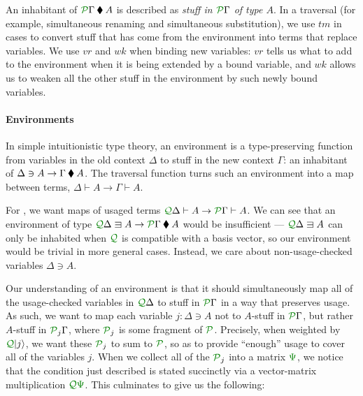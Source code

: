 \documentclass[submission,copyright,creativecommons]{eptcs}
\begin{document}
An inhabitant of $\ctx{\Gamma}{P} \kitrel A$ is described as
\emph{stuff in $\ctx{\Gamma}{P}$ of type $A$}.
In a traversal (for example, simultaneous renaming and simultaneous
substitution), we use $\mathit{tm}$ in  cases to convert stuff
that has come from the environment into terms that replace variables.
We use $\mathit{vr}$ and $\mathit{wk}$ when binding new variables: $\mathit{vr}$
tells us what to add to the environment when it is being extended by a bound
variable, and $\mathit{wk}$ allows us to weaken all the other stuff in the
environment by such newly bound variables.

\paragraph{Environments}
In simple intuitionistic type theory, an
environment is a type-preserving function from variables in the old
context $\Delta$ to stuff in the new context $\Gamma$: an inhabitant
of $\Delta \ni A \to \Gamma \mathbin{\blacklozenge} A$.  The traversal function turns
such an environment into a map between terms,
$\Delta \vdash A \to \Gamma \vdash A$.

For \name{}, we want maps of usaged terms
$\ctx{\Delta}{Q} \vdash A \to \ctx{\Gamma}{P} \vdash A$.
We can see that an environment of type
$\ctx{\Delta}{Q} \lvar A \to \ctx{\Gamma}{P} \kitrel A$ would
be insufficient --- $\ctx{\Delta}{Q} \lvar A$ can only be inhabited when
$\resctx Q$ is compatible with a basis vector, so our environment would be
trivial in more general cases.
Instead, we care about non-usage-checked variables $\Delta \ni A$.

Our understanding of an environment is that it should simultaneously
map all of the usage-checked variables in $\ctx{\Delta}{Q}$ to stuff
in $\ctx{\Gamma}{P}$ in a way that preserves usage.  As such, we want
to map each variable $j : \Delta \ni A$ not to $A$-stuff in
$\ctx{\Gamma}{P}$, but rather $A$-stuff in $\resctx P_j\Gamma$, where
$\resctx P_j$ is some fragment of $\resctx P$.  Precisely, when
weighted by $\resctx Q\lvert j \rangle$, we want these $\resctx P_j$
to sum to $\resctx P$, so as to provide ``enough'' usage to cover all
of the variables $j$.  When we collect all of the $\resctx P_j$ into a
matrix $\rescomment\Psi$, we notice that the condition just described
is stated succinctly via a vector-matrix multiplication
$\resctx Q\rescomment\Psi$. This culminates to give us the following:
\end{document}
